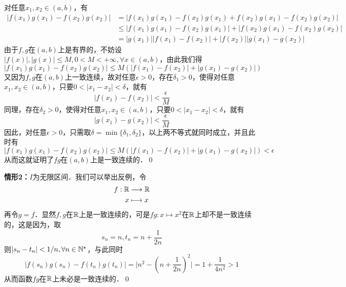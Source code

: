 \prove 对任意$x_1 , x_2 \in (a,b)$，有
\begin{align}
    \lvert f(x_1)g(x_1)-f(x_2)g(x_2)\rvert &= \lvert f(x_1)g(x_1) - f(x_2)g(x_1) + f(x_2)g(x_1) - f(x_2)g(x_2)\rvert \\
    &\leq \lvert f(x_1)g(x_1) - f(x_2)g(x_1) \rvert + \lvert f(x_2)g(x_1) - f(x_2)g(x_2) \rvert \\
    &= \lvert g(x_1) \rvert \lvert f(x_1) - f(x_2) \rvert + \lvert f(x_2) \rvert \lvert g(x_1) - g(x_2) \rvert
\end{align}
由于$f, g$在$(a,b)$上是有界的，不妨设$\lvert f(x) \rvert, \lvert g(x) \rvert \leq M, 0< M < +\infty, \forall x \in (a,b)$，由此我们得
\begin{equation}
    \lvert f(x_1)g(x_1) - f(x_2)g(x_2) \rvert \leq M \left(\lvert f(x_1) - f(x_2) \rvert + \lvert g(x_1)-g(x_2) \rvert\right)
\end{equation}
又因为$f, g$在$(a,b)$上一致连续，故对任意$\epsilon > 0$，存在$\delta_1 > 0$，使得对任意$x_1 , x_2 \in (a,b)$，只要$0 < \lvert x_1 - x_2 \rvert < \delta$，就有
\begin{equation}
    \lvert f(x_1) - f(x_2) \rvert < \frac{\epsilon}{M}
\end{equation}
同理，存在$\delta_2 > 0$，使得对任意$x_1, x_2 \in (a,b)$，只要$0 < \lvert x_1 - x_2 \rvert < \delta$，就有
\begin{equation}
    \lvert g(x_1) - g(x_2) \rvert < \frac{\epsilon}{M}
\end{equation}
因此，对任意$\epsilon > 0$，只需取$\delta = \min \{ \delta_1, \delta_2 \}$，以上两不等式就同时成立，并且此时有
\begin{equation}
    \lvert f(x_1)g(x_1) - f(x_2)g(x_2) \rvert \leq M \left(\lvert f(x_1)-f(x_2) \rvert + \lvert g(x_1)-g(x_2)\rvert \right) < \epsilon
\end{equation}
从而这就证明了$fg$在$(a,b)$上是一致连续的．\qed\bigskip

\textbf{情形2：}$I$为无限区间．我们可以举出反例，令
\begin{align}
    f: \mathbb{R} &\longrightarrow \mathbb{R} \\
    x &\longmapsto x
\end{align}
再令$g = f$．显然$f, g$在$\mathbb{R}$上是一致连续的，可是$fg: x \mapsto x^2$在$\mathbb{R}$上却不是一致连续的，这是因为，取
\begin{equation}
    s_n = n, t_n = n + \frac{1}{2n}
\end{equation}
则$\lvert s_n - t_n \rvert < 1/n, \forall n \in \mathbb{N}^\star$，与此同时
\begin{equation}
    \lvert f(s_n)g(s_n) - f(t_n)g(t_n) \rvert = \lvert n^2  - (n + \frac{1}{2n})^2 \rvert = 1 + \frac{1}{4n^2} > 1
\end{equation}
从而函数$fg$在$\mathbb{R}$上未必是一致连续的．\qed\bigskip

